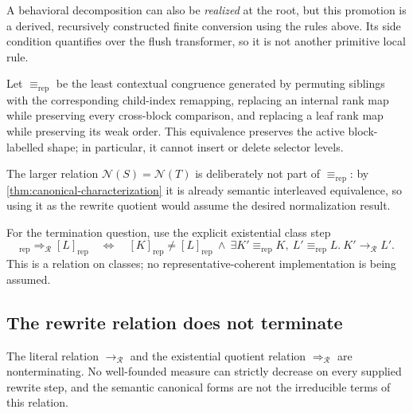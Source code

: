 A behavioral decomposition can also be \emph{realized} at the root, but this
promotion is a derived, recursively constructed finite conversion using the
rules above.  Its side condition quantifies over the flush transformer, so it
is not another primitive local rule.

\begin{definition}
\label{def:rewrite-representation}
Let \(\equiv_{\mathrm{rep}}\) be the least contextual congruence generated by
permuting siblings with the corresponding child-index remapping, replacing an
internal rank map while preserving every cross-block comparison, and
replacing a leaf rank map while preserving its weak order.  This equivalence
preserves the active block-labelled shape; in particular, it cannot insert or
delete selector levels.
\end{definition}

The larger relation \(\mathcal N(S)=\mathcal N(T)\) is deliberately not part
of \(\equiv_{\mathrm{rep}}\): by
\autoref{thm:canonical-characterization} it is already semantic interleaved
equivalence, so using it as the rewrite quotient would assume the desired
normalization result.

For the termination question, use the explicit existential class step
\begin{equation}
 [K]_{\mathrm{rep}}\Rightarrow_{\mathcal R}[L]_{\mathrm{rep}}
 \quad\Longleftrightarrow\quad
 [K]_{\mathrm{rep}}\ne[L]_{\mathrm{rep}}
 \ \land\ 
 \exists K'\equiv_{\mathrm{rep}}K,\ L'\equiv_{\mathrm{rep}}L.\
 K'\longrightarrow_{\mathcal R}L'.
 \label{eq:rewrite-quotient-step}
\end{equation}
This is a relation on classes; no representative-coherent implementation is
being assumed.

\subsection{The rewrite relation does not terminate}

\begin{theorem}
\label{thm:rewrite-nontermination}
The literal relation \(\longrightarrow_{\mathcal R}\) and the existential
quotient relation \(\Rightarrow_{\mathcal R}\) are nonterminating.  No
well-founded measure can
strictly decrease on every supplied rewrite step, and the semantic canonical
forms are not the irreducible terms of this relation.
\end{theorem}

